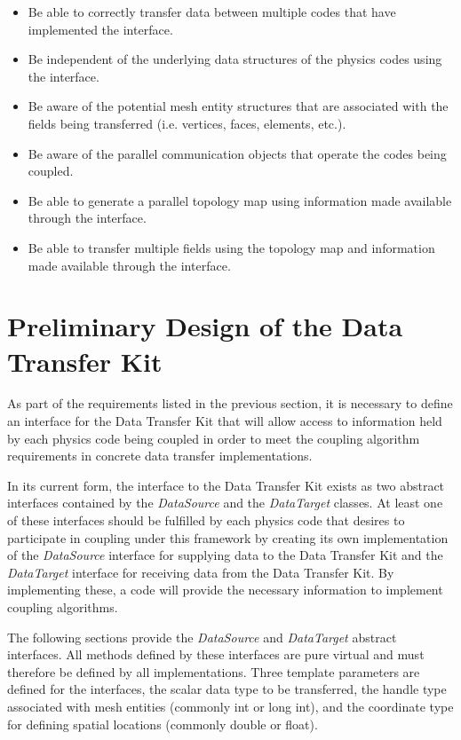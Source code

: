 \documentclass[letterpaper]{article}
\begin{document}
\begin{itemize}
\item Be able to correctly transfer data between multiple codes that
  have implemented the interface.
\item Be independent of the underlying data structures of the physics
  codes using the interface.
\item Be aware of the potential mesh entity structures that are
  associated with the fields being transferred (i.e. vertices, faces,
  elements, etc.).
\item Be aware of the parallel communication objects that operate the
  codes being coupled.
\item Be able to generate a parallel topology map using information
  made available through the interface.
\item Be able to transfer multiple fields using the topology map and
  information made available through the interface.
\end{itemize}

\section{Preliminary Design of the Data Transfer Kit}
As part of the requirements listed in the previous section, it is
necessary to define an interface for the Data Transfer Kit that will
allow access to information held by each physics code being coupled in
order to meet the coupling algorithm requirements in concrete data
transfer implementations.

In its current form, the interface to the Data Transfer Kit exists as
two abstract interfaces contained by the {\sl DataSource} and the
{\sl DataTarget} classes. At least one of these interfaces should be
fulfilled by each physics code that desires to participate in coupling
under this framework by creating its own implementation of the {\sl
  DataSource} interface for supplying data to the Data Transfer Kit
and the {\sl DataTarget} interface for receiving data from the
Data Transfer Kit. By implementing these, a code will provide the
necessary information to implement coupling algorithms. 

The following sections provide the {\sl DataSource} and {\sl
  DataTarget} abstract interfaces. All methods defined by these
interfaces are pure virtual and must therefore be defined by all
implementations. Three template parameters are defined for the
interfaces, the scalar data type to be transferred, the handle type
associated with mesh entities (commonly int or long int), and the
coordinate type for defining spatial locations (commonly double or float).
\end{document}
